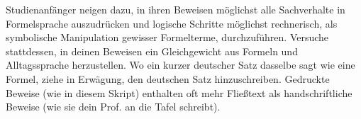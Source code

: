 \begin{bem}
    Studienanfänger neigen dazu, in ihren Beweisen möglichst alle Sachverhalte in Formelsprache auszudrücken und logische Schritte möglichst rechnerisch, als symbolische Manipulation gewisser Formelterme, durchzuführen. Versuche stattdessen, in deinen Beweisen ein Gleichgewicht aus Formeln und Alltagssprache herzustellen. Wo ein kurzer deutscher Satz dasselbe sagt wie eine Formel, ziehe in Erwägung, den deutschen Satz hinzuschreiben. Gedruckte Beweise (wie in diesem Skript) enthalten oft mehr Fließtext als handschriftliche Beweise (wie sie dein Prof. an die Tafel schreibt).
\end{bem}

